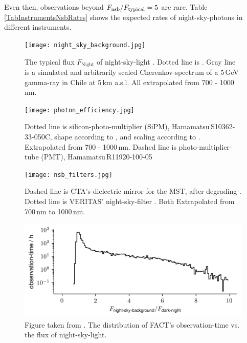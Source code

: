\documentclass{article}%
\begin{document}
\begin{multicols}{2}
%
Even then, observations beyond $F_\text{nsb}{} / F_\text{typical}{} = 5$ are rare.
%
Table \ref{TabInstrumentsNsbRates} shows the expected rates of night-sky-photons in different instruments.
%
\begin{figure}[H]%
\centering%
\texttt{[image: night\_sky\_background.jpg]}%
\caption{
The typical flux $F_\text{Night}$ of night-sky-light \cite{gaug2013night}.
Dotted line is \cite{preuss2002study}.
Gray line is a simulated and arbitrarily scaled Cherenkov-spectrum of a 5\,GeV gamma-ray in Chile at 5\,km a.s.l.
All extrapolated from 700 - 1000\,nm.
}%
\label{fig:nsb}
\end{figure}
%
\begin{figure}[H]%
\centering%
\texttt{[image: photon\_efficiency.jpg]}%
\caption{
Dotted line is silicon-photo-multiplier (SiPM), \mbox{Hamamatsu\,S10362-33-050C}, shape according to \cite{hamamatsu2009mppc}, and scaling according to \cite{anderhub2013design}.
Extrapolated from 700 - 1000\,nm.
Dashed line is photo-multiplier-tube (PMT), \mbox{Hamamatsu\,R11920-100-05} \cite{toyama2013novel}
}%
\label{fig:pde}
\end{figure}
%
\begin{figure}[H]%
\centering%
\texttt{[image: nsb\_filters.jpg]}%
\caption{
Dashed line is CTA's dielectric mirror for the MST, after degrading \cite{pareschi2013status,pareschi2013statusarxiv}.
%
Dotted line is VERITAS' night-sky-filter \cite{archambault2017gamma}.
%
Both Extrapolated from 700\,nm to 1000\,nm.
}%
\label{FigNsbFilter}
\end{figure}
%
\begin{figure}[H]%
\centering%
\includegraphics[width=1.0\linewidth]{observation_time_histogram.png}%
\caption{
Figure taken from \cite{mueller2019phd}.
%
The distribution of FACT's observation-time vs. the flux of night-sky-light.
}%
\label{fig:obstimeFact}
\end{figure}
%
\begin{table}[H]
  \begin{center}

\end{center}
\end{table}
\end{multicols}
\end{document}
